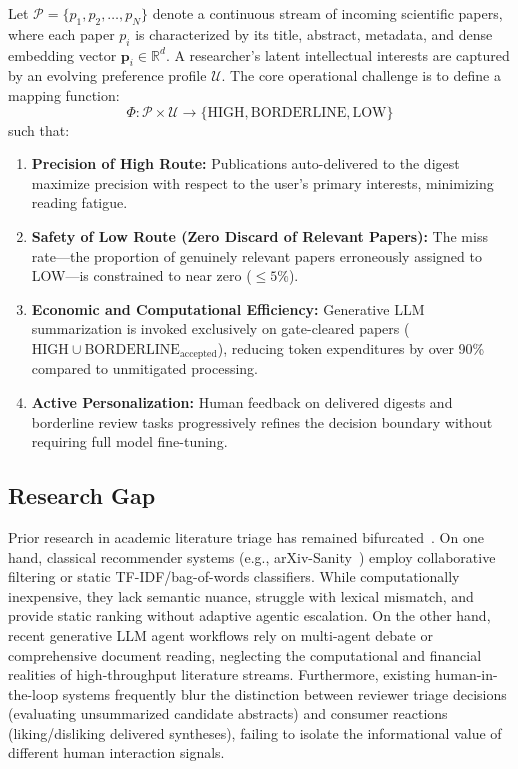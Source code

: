Let $\mathcal{P} = \{p_1, p_2, \dots, p_N\}$ denote a continuous stream of incoming scientific papers, where each paper $p_i$ is characterized by its title, abstract, metadata, and dense embedding vector $\mathbf{p}_i \in \mathbb{R}^d$. A researcher's latent intellectual interests are captured by an evolving preference profile $\mathcal{U}$. The core operational challenge is to define a mapping function:
\begin{equation}
\Phi: \mathcal{P} \times \mathcal{U} \to \{\text{HIGH}, \text{BORDERLINE}, \text{LOW}\}
\end{equation}
such that:
\begin{enumerate}
    \item \textbf{Precision of High Route:} Publications auto-delivered to the digest maximize precision with respect to the user's primary interests, minimizing reading fatigue.
    \item \textbf{Safety of Low Route (Zero Discard of Relevant Papers):} The miss rate---the proportion of genuinely relevant papers erroneously assigned to LOW---is constrained to near zero ($\le 5\%$).
    \item \textbf{Economic and Computational Efficiency:} Generative LLM summarization is invoked exclusively on gate-cleared papers ($\text{HIGH} \cup \text{BORDERLINE}_{\text{accepted}}$), reducing token expenditures by over 90\% compared to unmitigated processing.
    \item \textbf{Active Personalization:} Human feedback on delivered digests and borderline review tasks progressively refines the decision boundary without requiring full model fine-tuning.
\end{enumerate}

\subsection{Research Gap}
\label{sec:research_gap}

Prior research in academic literature triage has remained bifurcated~\cite{tiropanis2020web}. On one hand, classical recommender systems (e.g., arXiv-Sanity~\cite{karpathy2015arxivsanity}) employ collaborative filtering or static TF-IDF/bag-of-words classifiers. While computationally inexpensive, they lack semantic nuance, struggle with lexical mismatch, and provide static ranking without adaptive agentic escalation. On the other hand, recent generative LLM agent workflows rely on multi-agent debate or comprehensive document reading, neglecting the computational and financial realities of high-throughput literature streams. Furthermore, existing human-in-the-loop systems frequently blur the distinction between reviewer triage decisions (evaluating unsummarized candidate abstracts) and consumer reactions (liking/disliking delivered syntheses), failing to isolate the informational value of different human interaction signals.

